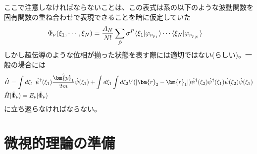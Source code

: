 \documentclass[dvipdfmx, 11pt, a4paper]{jsarticle}
\numberwithin{equation}{section}
\theoremstyle{definition}
\begin{document}
    ここで注意しなければならないことは、この表式は系の以下のような波動関数を固有関数の重ね合わせで表現できることを暗に仮定していた
    \begin{align}
        \Phi_\nu (\xi_1,\cdots,\xi_N) &= \frac{A_N}{N!} \sum_{\hat{P}} \sigma^P \langle \xi_{1}|\varphi_{\nu_{p_1}} \rangle \cdots \langle \xi_{N}|\varphi_{\nu_{p_N}} \rangle \notag 
    \end{align}
    しかし超伝導のような位相が揃った状態を表す際には適切ではない(らしい)。一般の場合には
    \begin{align}
        &\hat{H} = \int d\xi_1\ \hat{\psi}^\dagger (\xi_1) \frac{\hat{\bm{p}_1}}{2m} \hat{\psi}(\xi_1) + \int d\xi_1 \int d\xi_2 V(|\bm{r}_2 - \bm{r}_1|) \hat{\psi}^\dagger(\xi_2) \hat{\psi}^\dagger(\xi_1) \hat{\psi}(\xi_2) \hat{\psi}(\xi_1) \notag \\
        &\hat{H} |\tilde{\Phi}_\nu \rangle = E_\nu |\tilde{\Phi}_\nu \rangle \notag 
    \end{align}
    に立ち返らなければならない。
\section{微視的理論の準備}
\end{document}
